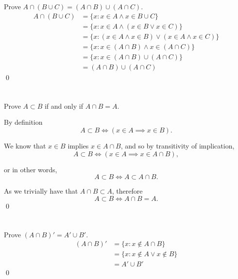 \section{}\label{sec:1-7}

Prove $A \cap (B \cup C) = (A \cap B) \cup (A \cap C)$.
\hr
\begin{align*}
    A \cap (B \cup C) &= \{x : x \in A \land x \in B \cup C\} \\
    &= \{x : x \in A \land (x \in B \lor x \in C)\} \\
    &= \{x : (x \in A \land x \in B) \lor (x \in A \land x \in C)\} \\
    &= \{x : x \in (A \cap B) \land x \in (A \cap C)\} \\
    &= \{x : x \in (A \cap B) \cup (A \cap C)\} \\
    &= (A \cap B) \cup (A \cap C)
\end{align*}\qed

\section{}\label{sec:1-8}

Prove $A \subset B$ if and only if $A \cap B = A$.
\hr

By definition
\[A \subset B \iff (x \in A \implies x \in B).\]

We know that $x \in B$ implies $x \in A \cap B$, and so by transitivity of implication,
\[A \subset B \iff (x \in A \implies x \in A \cap B),\]

or in other words,
\[A \subset B \iff A \subset A \cap B.\]

As we trivially have that $A \cap B \subset A$, therefore
\[A \subset B \iff A \cap B = A.\]\qed

\section{}\label{sec:1-9}

Prove $(A \cap B)' = A' \cup B'$.
\hr
\begin{align*}
    (A \cap B)' &= \{x : x \notin A \cap B\} \\
    &= \{x : x \notin A \lor x \notin B\} \\
    &= A' \cup B'
\end{align*}\qed
\pagebreak
\section{}\label{sec:1-10}

